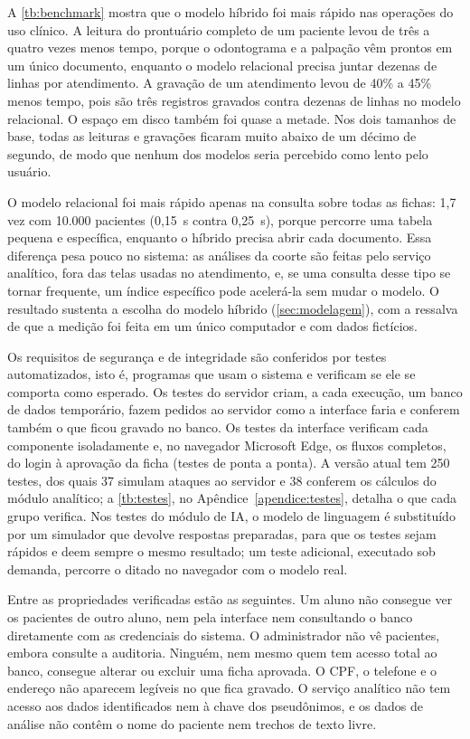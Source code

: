 A \autoref{tb:benchmark} mostra que o modelo híbrido foi mais rápido nas operações do uso clínico. A leitura do prontuário completo de um paciente levou de três a quatro vezes menos tempo, porque o odontograma e a palpação vêm prontos em um único documento, enquanto o modelo relacional precisa juntar dezenas de linhas por atendimento. A gravação de um atendimento levou de 40\% a 45\% menos tempo, pois são três registros gravados contra dezenas de linhas no modelo relacional. O espaço em disco também foi quase a metade. Nos dois tamanhos de base, todas as leituras e gravações ficaram muito abaixo de um décimo de segundo, de modo que nenhum dos modelos seria percebido como lento pelo usuário.

O modelo relacional foi mais rápido apenas na consulta sobre todas as fichas: 1,7 vez com 10.000 pacientes (0,15~s contra 0,25~s), porque percorre uma tabela pequena e específica, enquanto o híbrido precisa abrir cada documento. Essa diferença pesa pouco no sistema: as análises da coorte são feitas pelo serviço analítico, fora das telas usadas no atendimento, e, se uma consulta desse tipo se tornar frequente, um índice específico pode acelerá-la sem mudar o modelo. O resultado sustenta a escolha do modelo híbrido (\autoref{sec:modelagem}), com a ressalva de que a medição foi feita em um único computador e com dados fictícios.

Os requisitos de segurança e de integridade são conferidos por testes automatizados, isto é, programas que usam o sistema e verificam se ele se comporta como esperado. Os testes do servidor criam, a cada execução, um banco de dados temporário, fazem pedidos ao servidor como a interface faria e conferem também o que ficou gravado no banco. Os testes da interface verificam cada componente isoladamente e, no navegador Microsoft Edge, os fluxos completos, do login à aprovação da ficha (testes de ponta a ponta). A versão atual tem 250 testes, dos quais 37 simulam ataques ao servidor e 38 conferem os cálculos do módulo analítico; a \autoref{tb:testes}, no Apêndice~\ref{apendice:testes}, detalha o que cada grupo verifica. Nos testes do módulo de IA, o modelo de linguagem é substituído por um simulador que devolve respostas preparadas, para que os testes sejam rápidos e deem sempre o mesmo resultado; um teste adicional, executado sob demanda, percorre o ditado no navegador com o modelo real.

Entre as propriedades verificadas estão as seguintes. Um aluno não consegue ver os pacientes de outro aluno, nem pela interface nem consultando o banco diretamente com as credenciais do sistema. O administrador não vê pacientes, embora consulte a auditoria. Ninguém, nem mesmo quem tem acesso total ao banco, consegue alterar ou excluir uma ficha aprovada. O CPF, o telefone e o endereço não aparecem legíveis no que fica gravado. O serviço analítico não tem acesso aos dados identificados nem à chave dos pseudônimos, e os dados de análise não contêm o nome do paciente nem trechos de texto livre.

